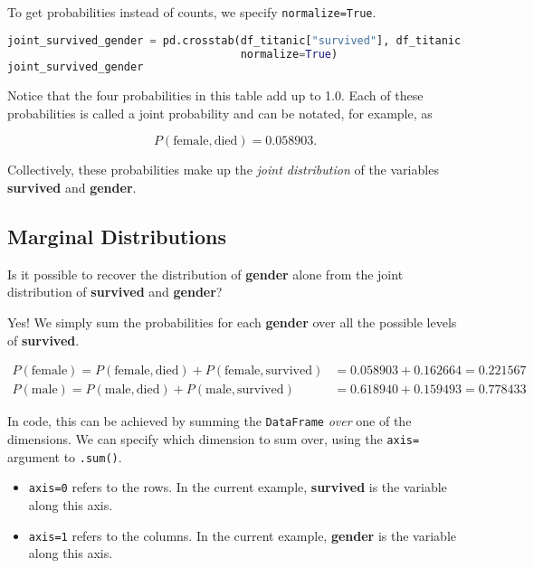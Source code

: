 To get probabilities instead of counts, we specify \verb|normalize=True|.

\begin{lstlisting}[language=Python]
joint_survived_gender = pd.crosstab(df_titanic["survived"], df_titanic["gender"], 
                                    normalize=True)
joint_survived_gender
\end{lstlisting}




Notice that the four probabilities in this table add up to 1.0. Each of these probabilities is called a joint probability and can be notated, for example, as

$$ P(\text{female}, \text{died}) = 0.058903.$$

Collectively, these probabilities make up the \textit{joint distribution} of the variables \textbf{survived} and \textbf{gender}.



\subsection{Marginal Distributions}\label{2.2.1}

Is it possible to recover the distribution of \textbf{gender} alone from the joint distribution of \textbf{survived} and \textbf{gender}?



Yes! We simply sum the probabilities for each \textbf{gender} over all the possible levels of \textbf{survived}.

\begin{align}
P(\text{female}) = P(\text{female}, \text{died}) + P(\text{female}, \text{survived}) &= 0.058903 + 0.162664 = 0.221567 \\
P(\text{male}) = P(\text{male}, \text{died}) + P(\text{male}, \text{survived}) &= 0.618940 + 0.159493 = 0.778433\end{align}



In code, this can be achieved by summing the \verb|DataFrame| \textit{over} one of the dimensions. We can specify which dimension to sum over, using the \verb|axis=| argument to \verb|.sum()|.
\begin{itemize}
\item 
\verb|axis=0| refers to the rows. In the current example, \textbf{survived} is the variable along this axis.

\item 
\verb|axis=1| refers to the columns. In the current example, \textbf{gender} is the variable along this axis.

\end{itemize}

